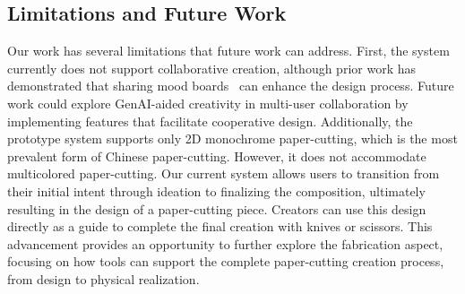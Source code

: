 \subsection{Limitations and Future Work}\label{lf}
Our work has several limitations that future work can address.
First, the system currently does not support collaborative creation, although prior work has demonstrated that sharing mood boards~\cite{Koch:2019:mayai, Koch:2020:semanticcollage} can enhance the design process. Future work could explore GenAI-aided creativity in multi-user collaboration by implementing features that facilitate cooperative design.
Additionally, the prototype system supports only 2D monochrome paper-cutting, which is the most prevalent form of Chinese paper-cutting. However, it does not accommodate multicolored paper-cutting.
Our current system allows users to transition from their initial intent through ideation to finalizing the composition, ultimately resulting in the design of a paper-cutting piece. Creators can use this design directly as a guide to complete the final creation with knives or scissors. This advancement provides an opportunity to further explore the fabrication aspect, focusing on how tools can support the complete paper-cutting creation process, from design to physical realization.
